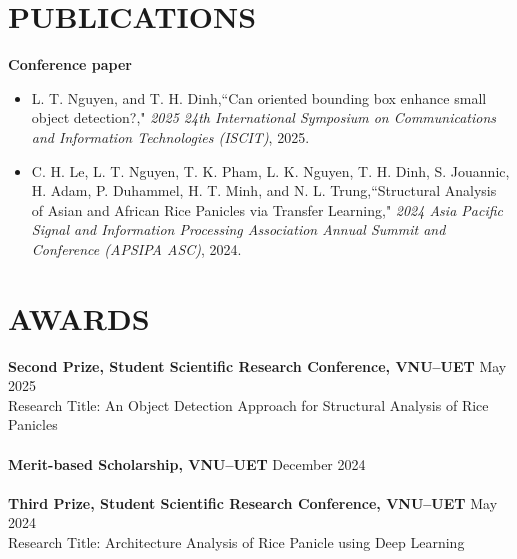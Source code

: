 \documentclass[a4paper,9pt]{extarticle}
\newcommand{\colormyname}[1]{\textcolor{myred}{#1}}
\begin{document}
\section*{PUBLICATIONS}

\noindent
\textbf{Conference paper}
\begin{itemize}[itemsep=3pt]
    \item \colormyname{L. T. Nguyen}, and T. H. Dinh,``Can oriented bounding box enhance small object detection?," \textit{2025 24th International Symposium on Communications and Information Technologies (ISCIT)}, 2025.
    \item C. H. Le, \colormyname{L. T. Nguyen}, T. K. Pham, L. K. Nguyen, T. H. Dinh, S. Jouannic, H. Adam, P. Duhammel, H. T. Minh, and N. L. Trung,``Structural Analysis of Asian and African Rice Panicles via Transfer Learning," \textit{2024 Asia Pacific Signal and Information Processing Association Annual Summit and Conference (APSIPA ASC)}, 2024.
\end{itemize}

\section*{AWARDS}
\textbf{Second Prize, Student Scientific Research Conference, VNU--UET} \hfill May 2025\\ 
Research Title: An Object Detection Approach for Structural Analysis of Rice Panicles \\ \\
\textbf{Merit-based Scholarship, VNU--UET} \hfill  December 2024 \\ \\
\textbf{Third Prize, Student Scientific Research Conference, VNU--UET} \hfill May 2024\\ 
Research Title: Architecture Analysis of Rice Panicle using Deep Learning 
\end{document}
